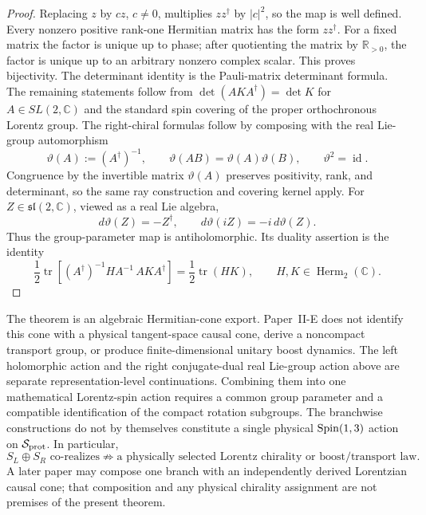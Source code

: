 \documentclass[12pt,a4paper]{article}
\begin{document}
\begin{proof}
Replacing \(z\) by \(cz\), \(c\ne0\), multiplies \(zz^\dagger\) by
\(|c|^2\), so the map is well defined.  Every nonzero positive rank-one
Hermitian matrix has the form \(zz^\dagger\).  For a fixed matrix the factor
is unique up to phase; after quotienting the matrix by
\(\mathbb R_{>0}\), the factor is unique up to an arbitrary nonzero complex
scalar.  This proves bijectivity.  The determinant identity
is the Pauli-matrix determinant formula.  The remaining statements follow
from \(\det(AKA^\dagger)=\det K\) for \(A\in SL(2,\mathbb C)\) and the
standard spin covering of the proper orthochronous Lorentz group.  The
right-chiral formulas follow by composing with the real Lie-group
automorphism
\[
 \vartheta(A):=(A^\dagger)^{-1},\qquad
 \vartheta(AB)=\vartheta(A)\vartheta(B),\qquad
 \vartheta^2=\operatorname{id}.
\]
Congruence by the invertible matrix \(\vartheta(A)\) preserves positivity,
rank, and determinant, so the same ray construction and covering kernel
apply.  For \(Z\in\mathfrak{sl}(2,\mathbb C)\), viewed as a real Lie
algebra,
\[
 d\vartheta(Z)=-Z^\dagger,\qquad
 d\vartheta(iZ)=-i\,d\vartheta(Z).
\]
Thus the group-parameter map is antiholomorphic.  Its duality assertion is
the identity
\[
 \frac12\operatorname{tr}\!\left[
   (A^\dagger)^{-1}HA^{-1}\,AKA^\dagger\right]
 =\frac12\operatorname{tr}(HK),
 \qquad H,K\in\operatorname{Herm}_2(\mathbb C).
\]
\end{proof}

\begin{remark}
\label{p2e:rem:celestial-physical-boundary}
The theorem is an algebraic Hermitian-cone export.  Paper~II-E does not
identify this cone with a physical tangent-space causal cone, derive a
noncompact transport group, or produce finite-dimensional unitary boost
dynamics.  The left holomorphic action and the right conjugate-dual
real Lie-group action above are separate representation-level continuations.
Combining them into one mathematical Lorentz-spin action requires a common
group parameter and a compatible identification of the compact rotation
subgroups.  The branchwise constructions do not by themselves constitute a
single physical \(\mathrm{Spin}(1,3)\) action on \(\mathcal S_{\rm prot}\).  In
particular,
\[
 \boxed{S_L\oplus S_R\text{ co-realizes}\not\Longrightarrow\text{a physically selected Lorentz chirality or boost/transport law}.}
\]
A later paper may compose one branch with an independently derived Lorentzian
causal cone; that composition and any physical chirality assignment are not
premises of the present theorem.
\end{remark}
\end{document}
